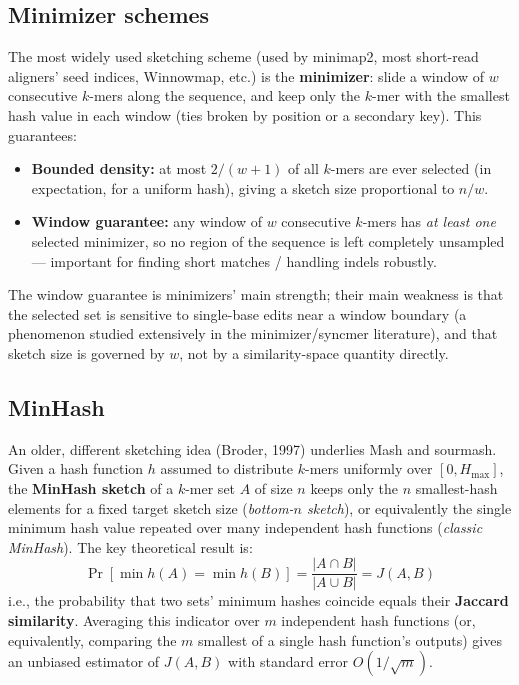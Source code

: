 \subsection{Minimizer schemes}
\label{sec:minimizers}

The most widely used sketching scheme (used by minimap2, most short-read aligners' seed indices,
Winnowmap, etc.) is the \textbf{minimizer}: slide a window of $w$ consecutive $k$-mers along the
sequence, and keep only the $k$-mer with the smallest hash value in each window (ties broken by
position or a secondary key). This guarantees:
\begin{itemize}[nosep]
  \item \textbf{Bounded density:} at most $2/(w+1)$ of all $k$-mers are ever selected (in
    expectation, for a uniform hash), giving a sketch size proportional to $n/w$.
  \item \textbf{Window guarantee:} any window of $w$ consecutive $k$-mers has \emph{at least one}
    selected minimizer, so no region of the sequence is left completely unsampled --- important
    for finding short matches / handling indels robustly.
\end{itemize}
The window guarantee is minimizers' main strength; their main weakness is that the selected set is
sensitive to single-base edits near a window boundary (a phenomenon studied extensively in the
minimizer/syncmer literature), and that sketch size is governed by $w$, not by a similarity-space
quantity directly.

\subsection{MinHash}
\label{sec:minhash}

An older, different sketching idea (Broder, 1997) underlies Mash and sourmash. Given a hash
function $h$ assumed to distribute $k$-mers uniformly over $[0, H_{\max}]$, the \textbf{MinHash
sketch} of a $k$-mer set $A$ of size $n$ keeps only the $n$ smallest-hash elements for a
fixed target sketch size (\emph{bottom-$n$ sketch}), or equivalently the single minimum hash
value repeated over many independent hash functions (\emph{classic MinHash}). The key theoretical
result is:
\[
  \Pr[\min h(A) = \min h(B)] = \frac{|A \cap B|}{|A \cup B|} = J(A,B)
\]
i.e., the probability that two sets' minimum hashes coincide equals their \textbf{Jaccard
similarity}. Averaging this indicator over $m$ independent hash functions (or, equivalently,
comparing the $m$ smallest of a single hash function's outputs) gives an unbiased estimator of
$J(A,B)$ with standard error $O(1/\sqrt{m})$.

